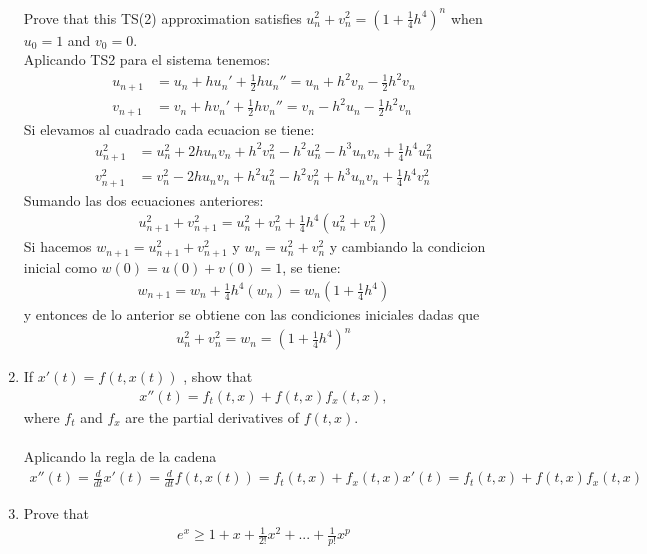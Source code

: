 \begin{enumerate}
		Prove that this TS(2) approximation satisfies $u_n^2 + v_n^2 = (1 + \frac{1}{4}h^4)^n$ when $u_0 = 1$ and $v_0 = 0$.
		\\
		Aplicando TS2 para el sistema tenemos:\\
		\begin{align*}
			u_{n+1} &= u_n + hu_n' + \frac{1}{2}hu_n'' = u_n + h^2v_n - \frac{1}{2}h^2v_n\\
			v_{n+1} &= v_n + hv_n' + \frac{1}{2}hv_n'' = v_n - h^2u_n - \frac{1}{2}h^2v_n
		\end{align*}
		Si elevamos al cuadrado cada ecuacion se tiene:
		\begin{align*}
			u_{n+1}^2 &= u_n^2 + 2hu_nv_n + h^2v_n^2 - h^2u_n^2 - h^3u_nv_n + \frac{1}{4}h^4u_n^2 \\
			v_{n+1}^2 &= v_n^2 - 2hu_nv_n + h^2u_n^2 - h^2v_n^2 + h^3u_nv_n + \frac{1}{4}h^4v_n^2
		\end{align*}
		Sumando las dos ecuaciones anteriores:
		\begin{align*}
			u_{n+1}^2 + v_{n+1}^2 = u_n^2 + v_n^2 + \frac{1}{4}h^4(u_n^2 + v_n^2)
		\end{align*}
		Si hacemos $w_{n+1} = u_{n+1}^2 + v_{n+1}^2$ y $w_n = u_n^2 + v_n^2$ y cambiando 
		la condicion inicial como $w(0) = u(0) + v(0) = 1$,  se tiene:
		\begin{align*}
			w_{n+1} = w_n + \frac{1}{4}h^4(w_n) = w_n(1 + \frac{1}{4}h^4) 
		\end{align*}
		y entonces de lo anterior se obtiene con las condiciones iniciales dadas que
		\begin{align*}
			u_{n}^2 + v_{n}^2 = w_n = (1 + \frac{1}{4}h^4)^n
		\end{align*}			
	\item
		If $x'(t) = f (t, x(t))$ , show that
		\begin{align*}
			x''(t) = f_t(t, x) + f (t, x)f_x(t, x),
		\end{align*}
			where $f_t$ and $f_x$ are the partial derivatives of $f(t, x)$.\\
			\\
			Aplicando la regla de la cadena
		\begin{align*}
			x''(t) = \frac{d}{dt}x'(t) = \frac{d}{dt}f(t, x(t)) = f_t(t, x) + f_x(t, x)x'(t) = f_t(t, x) + f (t, x)f_x(t, x)
		\end{align*}		
	\item
		Prove that
		\begin{align*}
			e^x \geq 1 + x + \frac{1}{2!} x^2 + ... + \frac{1}{p!} x^p
		\end{align*}

\end{enumerate}
